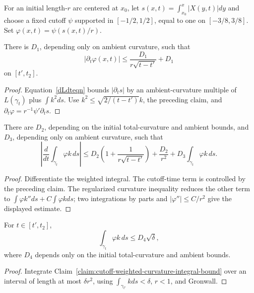 For an initial length-$r$ arc centered at $x_0$, let
$s(x,t)=\int_{x_0}^x|X(y,t)|dy$ and choose a fixed cutoff $\psi$ supported in
$[-1/2,1/2]$, equal to one on $[-3/8,3/8]$. Set
$\varphi(x,t)=\psi(s(x,t)/r)$.

\begin{claim}
\label{claim:cutoff-function-time-derivative-bound}
\label{1887}
There is $D_1$, depending only on ambient curvature, such that
\[
|\partial_t\varphi(x,t)|
\le\frac{D_1}{r\sqrt{t-t'}}+D_1
\]
on $[t',t_2]$.
\end{claim}
\begin{proof}
\sketch Equation~\eqref{dLdteqn} bounds
$|\partial_ts|$ by an ambient-curvature multiple of $L(\gamma_t)$ plus
$\int k^2ds$. Use $k^2\le\sqrt{2/(t-t')}k$, the preceding claim, and
$\partial_t\varphi=r^{-1}\psi'\partial_ts$.
\end{proof}

\begin{claim}
\label{claim:cutoff-weighted-curvature-integral-bound}
\label{claim1885}
There are $D_2$, depending on the initial total-curvature and ambient bounds,
and $D_3$, depending only on ambient curvature, such that
\[
\left|\frac d{dt}\int_{\gamma_t}\varphi k\,ds\right|
\le D_2\left(1+\frac1{r\sqrt{t-t'}}\right)+\frac{D_2}{r^2}
+D_3\int_{\gamma_t}\varphi k\,ds.
\]
\end{claim}
\begin{proof}
\sketch Differentiate the weighted integral. The cutoff-time term is controlled by the
preceding claim. The regularized curvature inequality reduces the other term
to $\int\varphi k''ds+C\int\varphi kds$; two integrations by parts and
$|\varphi''|\le C/r^2$ give the displayed estimate.
\end{proof}

\begin{corollary}
\label{cor:cutoff-weighted-curvature-integral-sqrt-bound}
For $t\in[t',t_2]$,
\[
\int_{\gamma_t}\varphi k\,ds\le D_4\sqrt\delta,
\]
where $D_4$ depends only on the initial total-curvature and ambient bounds.
\end{corollary}
\begin{proof}
\sketch Integrate Claim~\ref{claim:cutoff-weighted-curvature-integral-bound}
over an interval of length at most $\delta r^2$, using
$\int_{\gamma_{t'}}kds<\delta$, $r<1$, and Gronwall.
\end{proof}

